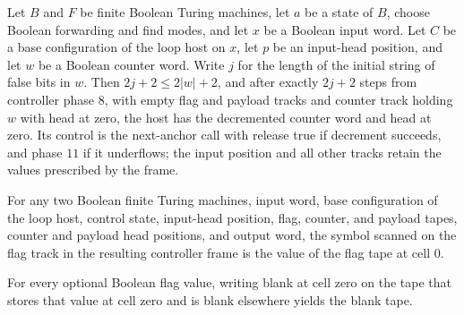 \begin{lemma}
\label{Turing.FinTM.loopHost_borrow}
\leanok
{}
Let $B$ and $F$ be finite Boolean Turing machines, let $a$ be a state of $B$, choose
Boolean forwarding and find modes, and let $x$ be a Boolean input word. Let $C$ be a
base configuration of the loop host on $x$, let $p$ be an input-head position, and let
$w$ be a Boolean counter word. Write $j$ for the length of the initial string of false
bits in $w$. Then $2j+2\le 2|w|+2$, and after exactly $2j+2$ steps from controller phase
$8$, with empty flag and payload tracks and counter track holding $w$ with head at zero,
the host has the decremented counter word and head at zero. Its control is the
next-anchor call with release true if decrement succeeds, and phase $11$ if it
underflows; the input position and all other tracks retain the values prescribed by the
frame.
\end{lemma}

\begin{lemma}
\label{Turing.FinTM.loopFrame_flag}
\leanok
{}
For any two Boolean finite Turing machines, input word, base configuration of the loop
host, control state, input-head position, flag, counter, and payload tapes, counter and
payload head positions, and output word, the symbol scanned on the flag track in the
resulting controller frame is the value of the flag tape at cell $0$.
\end{lemma}

\begin{lemma}
\label{Turing.FinTM.loopFlag_clear}
\leanok
{}
For every optional Boolean flag value, writing blank at cell zero on the tape that
stores that value at cell zero and is blank elsewhere yields the blank tape.
\end{lemma}


